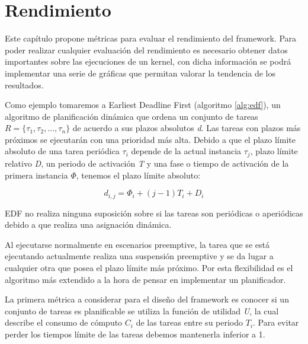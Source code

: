 \chapter{Rendimiento}
    \label{cha:Rendimiento}

Este capítulo propone métricas para evaluar el rendimiento del framework. Para poder realizar cualquier evaluación del rendimiento es necesario obtener datos importantes sobre las ejecuciones de un kernel, con dicha información se podrá implementar una serie de gráficas que permitan valorar la tendencia de los resultados.
\newline

Como ejemplo tomaremos a Earliest Deadline First (algoritmo \ref{alg:edf}), un algoritmo de planificación dinámica que ordena un conjunto de tareas \textit{$R=\{\tau_1,\tau_2,...,\tau_n\}$} de acuerdo a sus plazos absolutos \textit{d}. Las tareas con plazos más próximos se ejecutarán con una prioridad más alta\cite{Buta2011}. 
Debido a que el plazo límite absoluto de una tarea periódica \textit{$\tau_i$} depende de la actual instancia \textit{$\tau_j$}, plazo límite relativo \textit{D}, un periodo de activación \textit{T} y una fase o tiempo de activación de la primera instancia \textit{$\Phi$}, tenemos el plazo límite absoluto:

\begin{equation}
d_{i,j} = \Phi_i + (j-1)T_i + D_i
\end{equation}

EDF no realiza ninguna suposición sobre si las tareas son periódicas o aperiódicas debido a que realiza una asignación dinámica. 



Al ejecutarse normalmente en escenarios preemptive, la tarea que se está ejecutando actualmente realiza una suspensión preemptive y se da lugar a cualquier otra que posea el plazo límite más próximo. Por esta flexibilidad es el algoritmo más extendido a la hora de pensar en implementar un planificador.
\newline

La primera métrica a considerar para el diseño del framework es conocer si un conjunto de tareas es planificable se utiliza la función de utilidad \textit{U}, la cual describe el consumo de cómputo \textit{$C_i$} de las tareas entre su periodo \textit{$T_i$}. Para evitar perder los tiempos límite de las tareas debemos mantenerla inferior a 1.

